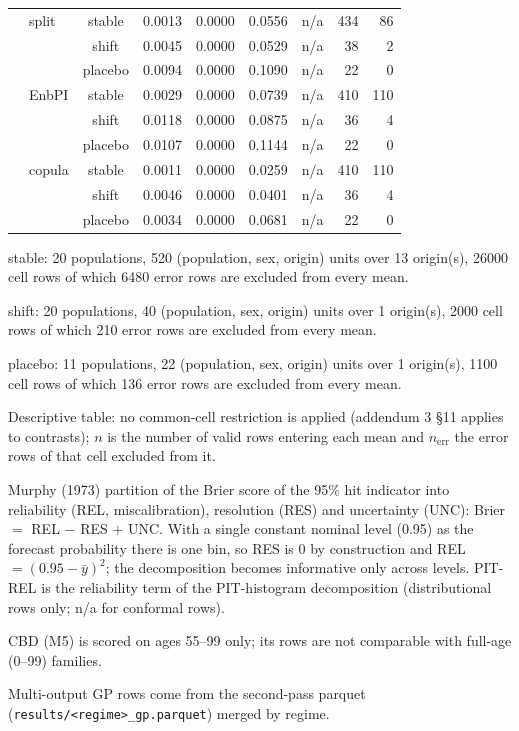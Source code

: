{\begin{longtable}{@{}llcrrrrrr@{}}
 & split & stable & 0.0013 & 0.0000 & 0.0556 & n/a & 434 & 86 \\
 &  & shift & 0.0045 & 0.0000 & 0.0529 & n/a & 38 & 2 \\
 &  & placebo & 0.0094 & 0.0000 & 0.1090 & n/a & 22 & 0 \\
 & EnbPI & stable & 0.0029 & 0.0000 & 0.0739 & n/a & 410 & 110 \\
 &  & shift & 0.0118 & 0.0000 & 0.0875 & n/a & 36 & 4 \\
 &  & placebo & 0.0107 & 0.0000 & 0.1144 & n/a & 22 & 0 \\
 & copula & stable & 0.0011 & 0.0000 & 0.0259 & n/a & 410 & 110 \\
 &  & shift & 0.0046 & 0.0000 & 0.0401 & n/a & 36 & 4 \\
 &  & placebo & 0.0034 & 0.0000 & 0.0681 & n/a & 22 & 0 \\
\end{longtable}
\noindent\begin{minipage}{\linewidth}\scriptsize\raggedright
\noindent stable: 20 populations, 520 (population, sex, origin) units over 13 origin(s), 26000 cell rows of which 6480 error rows are excluded from every mean.\par
\noindent shift: 20 populations, 40 (population, sex, origin) units over 1 origin(s), 2000 cell rows of which 210 error rows are excluded from every mean.\par
\noindent placebo: 11 populations, 22 (population, sex, origin) units over 1 origin(s), 1100 cell rows of which 136 error rows are excluded from every mean.\par
\noindent Descriptive table: no common-cell restriction is applied (addendum 3 \S11 applies to contrasts); $n$ is the number of valid rows entering each mean and $n_{\mathrm{err}}$ the error rows of that cell excluded from it.\par
\noindent Murphy (1973) partition of the Brier score of the 95\% hit indicator into reliability (REL, miscalibration), resolution (RES) and uncertainty (UNC): Brier $=$ REL $-$ RES $+$ UNC. With a single constant nominal level (0.95) as the forecast probability there is one bin, so RES is 0 by construction and REL $=(0.95-\bar{y})^2$; the decomposition becomes informative only across levels. PIT-REL is the reliability term of the PIT-histogram decomposition (distributional rows only; n/a for conformal rows).\par
\noindent CBD (M5) is scored on ages 55--99 only; its rows are not comparable with full-age (0--99) families.\par
\noindent Multi-output GP rows come from the second-pass parquet (\texttt{results/<regime>\_gp.parquet}) merged by regime.\par
\end{minipage}}
